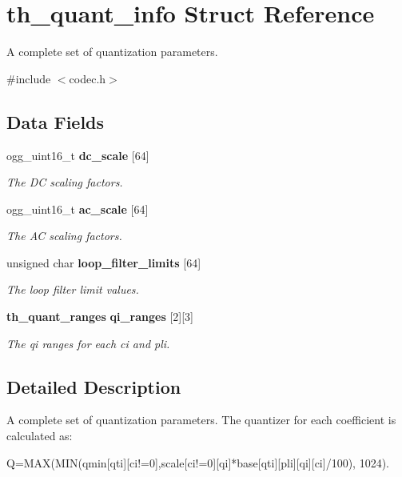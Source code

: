 \section{th\_\-quant\_\-info Struct Reference}
\label{structth__quant__info}


A complete set of quantization parameters.  




{\ttfamily \#include $<$codec.h$>$}

\subsection*{Data Fields}
\begin{DoxyCompactItemize}
\item 
ogg\_\-uint16\_\-t {\bf dc\_\-scale} [64]
\begin{DoxyCompactList}\small\item\em The DC scaling factors. \item\end{DoxyCompactList}\item 
ogg\_\-uint16\_\-t {\bf ac\_\-scale} [64]
\begin{DoxyCompactList}\small\item\em The AC scaling factors. \item\end{DoxyCompactList}\item 
unsigned char {\bf loop\_\-filter\_\-limits} [64]
\begin{DoxyCompactList}\small\item\em The loop filter limit values. \item\end{DoxyCompactList}\item 
{\bf th\_\-quant\_\-ranges} {\bf qi\_\-ranges} [2][3]
\begin{DoxyCompactList}\small\item\em The {\itshape qi\/} ranges for each {\itshape ci\/} and {\itshape pli\/}. \item\end{DoxyCompactList}\end{DoxyCompactItemize}


\subsection{Detailed Description}
A complete set of quantization parameters. The quantizer for each coefficient is calculated as: 
\begin{DoxyCode}
    Q=MAX(MIN(qmin[qti][ci!=0],scale[ci!=0][qi]*base[qti][pli][qi][ci]/100),
     1024).
\end{DoxyCode}


